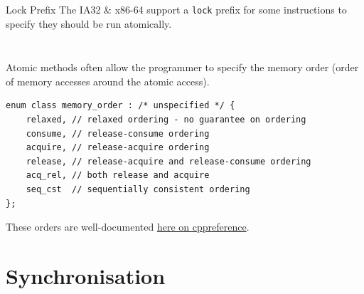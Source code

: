 \begin{sidenotebox}{Lock Prefix}
    The IA32 \& x86-64 support a \texttt{lock} prefix for some instructions to specify they should be run atomically. 

\begin{minipage}[t]{.55\textwidth}
    \inputminted{c}{parallelism/code/cmpxchg.c}
\end{minipage}
\begin{minipage}[t]{.45\textwidth}
    \inputminted{asm}{parallelism/code/cmpxchg.s}
\end{minipage}
\end{sidenotebox}

Atomic methods often allow the programmer to specify the memory order (order of memory accesses around the atomic access).
\begin{verbatim}
enum class memory_order : /* unspecified */ {
    relaxed, // relaxed ordering - no guarantee on ordering
    consume, // release-consume ordering
    acquire, // release-acquire ordering
    release, // release-acquire and release-consume ordering 
    acq_rel, // both release and acquire
    seq_cst  // sequentially consistent ordering
};
\end{verbatim}
These orders are well-documented \href{https://en.cppreference.com/w/cpp/atomic/memory_order}{here on cppreference}. 

\section{Synchronisation}

